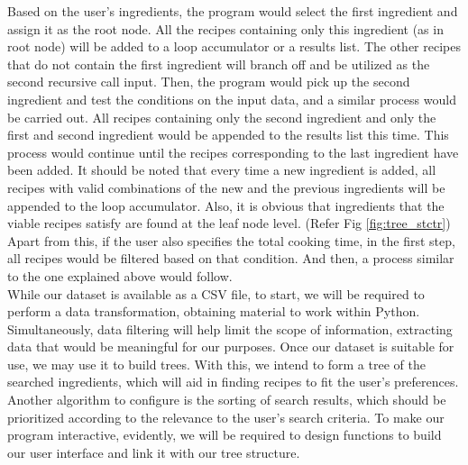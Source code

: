 \documentclass[fontsize=11pt]{article}
\begin{document}
    Based on the user's ingredients, the program would select the first ingredient and assign it as the root node. All the recipes containing only this ingredient (as in root node) will be added to a loop accumulator or a results list. The other recipes that do not contain the first ingredient will branch off and be utilized as the second recursive call input. Then, the program would pick up the second ingredient and test the conditions on the input data, and a similar process would be carried out. All recipes containing only the second ingredient and only the first and second ingredient would be appended to the results list this time. This process would continue until the recipes corresponding to the last ingredient have been added. It should be noted that every time a new ingredient is added, all recipes with valid combinations of the new and the previous ingredients will be appended to the loop accumulator. Also, it is obvious that ingredients that the viable recipes satisfy are found at the leaf node level. (Refer Fig \ref{fig:tree_stctr}) \\

    Apart from this, if the user also specifies the total cooking time, in the first step, all recipes would be filtered based on that condition. And then, a process similar to the one explained above would follow. \\

    While our dataset is available as a CSV file, to start, we will be required to perform a data transformation, obtaining material to work within Python. Simultaneously, data filtering will help limit the scope of information, extracting data that would be meaningful for our purposes. Once our dataset is suitable for use, we may use it to build trees. With this, we intend to form a tree of the searched ingredients, which will aid in finding recipes to fit the user's preferences. Another algorithm to configure is the sorting of search results, which should be prioritized according to the relevance to the user's search criteria. To make our program interactive, evidently, we will be required to design functions to build our user interface and link it with our tree structure. \\
\end{document}
